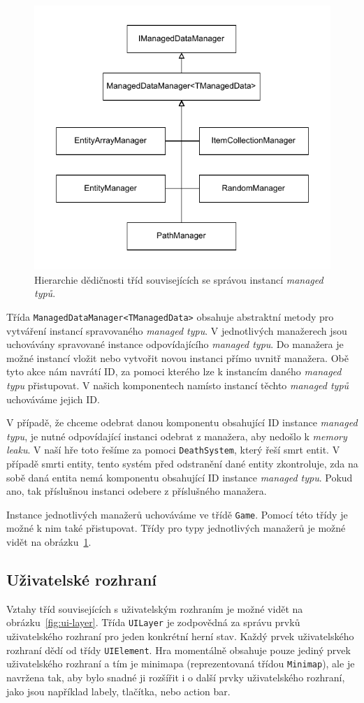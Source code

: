 \begin{figure}[!htb]
  \centering
  \includegraphics[width=0.6\linewidth]{img/managed_data_managers.pdf}
  \caption{Hierarchie dědičnosti tříd souvisejících se správou instancí \textit{managed typů}.}
  \label{fig:unmanaged-data-managers}
\end{figure}

Třída \texttt{ManagedDataManager<TManagedData>} obsahuje abstraktní metody pro vytváření instancí spravovaného \textit{managed typu}. V jednotlivých manažerech jsou uchovávány spravované instance odpovídajícího \textit{managed typu}. Do manažera je možné instancí vložit nebo vytvořit novou instanci přímo uvnitř manažera. Obě tyto akce nám navrátí ID, za pomoci kterého lze k instancím daného \textit{managed typu} přistupovat. V našich komponentech namísto instancí těchto \textit{managed typů} uchováváme jejich ID.

V případě, že chceme odebrat danou komponentu obsahující ID instance \textit{managed typu}, je nutné odpovídající instanci odebrat z manažera, aby nedošlo k \textit{memory leaku}. V naší hře toto řešíme za pomoci \texttt{DeathSystem}, který řeší smrt entit. V případě smrti entity, tento systém před odstranění dané entity zkontroluje, zda na sobě daná entita nemá komponentu obsahující ID instance \textit{managed typu}. Pokud ano, tak příslušnou instanci odebere z příslušného manažera.

Instance jednotlivých manažerů uchováváme ve třídě \texttt{Game}. Pomocí této třídy je možné k nim také přistupovat. Třídy pro typy jednotlivých manažerů je možné vidět na obrázku~\ref{fig:unmanaged-data-managers}.

\subsection{Uživatelské rozhraní}
Vztahy tříd souvisejících s uživatelským rozhraním je možné vidět na obrázku~\ref{fig:ui-layer}. Třída \texttt{UILayer} je zodpovědná za správu prvků uživatelského rozhraní pro jeden konkrétní herní stav. Každý prvek uživatelského rozhraní dědí od třídy \texttt{UIElement}. Hra momentálně obsahuje pouze jediný prvek uživatelského rozhraní a tím je minimapa (reprezentovaná třídou \texttt{Minimap}), ale je navržena tak, aby bylo snadné ji rozšířit i o další prvky uživatelského rozhraní, jako jsou například labely, tlačítka, nebo action bar.

